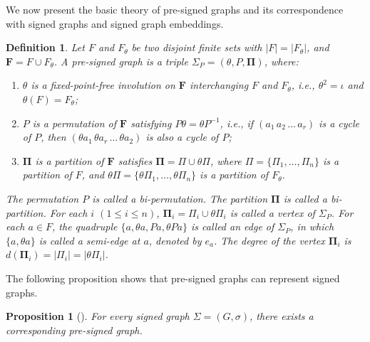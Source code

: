 \documentclass[10pt,a4paper]{amsart}
\newtheorem{proposition}[theorem]{Proposition}
\newtheorem{definition}[theorem]{Definition}
\begin{document}
We now present the basic theory of pre-signed graphs and its correspondence with signed graphs and signed graph embeddings.
\begin{definition}
Let $F$ and $F_{\theta}$ be two disjoint finite sets with $|F|=|F_{\theta}|$, and $\mathbf F=F\cup F_{\theta}$. A \emph{pre-signed graph} is a triple $\Sigma_P=(\theta,P,\mathbf{\Pi})$, where:
\begin{enumerate}[label=(\arabic*)]
\item $\theta$ is a fixed-point-free involution on $\mathbf F$ interchanging $F$ and $F_{\theta}$, i.e., $\theta^2=\iota$ and $\theta(F)=F_{\theta}$;
\item $P$ is a permutation of $\mathbf F$ satisfying $P\theta=\theta P^{-1}$, i.e., if $(a_1\,a_2\,\ldots\,a_r)$ is a cycle of $P$, then $(\theta a_1\,\theta a_r\,\ldots\,\theta a_2)$ is also a cycle of $P$;
\item $\mathbf{\Pi}$ is a partition of $\mathbf F$ satisfies
$\mathbf{\Pi}=\Pi\cup\theta\Pi$, where $\Pi=\{\Pi_1,\ldots,\Pi_n\}$ is a partition of $F$, and $\theta\Pi=\{\theta\Pi_1,\ldots,\theta\Pi_n\}$ is a partition of $F_{\theta}$.
\end{enumerate}
The permutation $P$ is called a \emph{bi-permutation}.
The partition $\mathbf{\Pi}$ is called a \emph{bi-partition}.
For each $i$ $(1\leq i\leq n)$, $\mathbf{\Pi}_i=\Pi_i\cup\theta\Pi_i$ is called a {\it vertex} of $\Sigma_P$. For each $a\in F$, the quadruple $\{a, \theta a, Pa, \theta Pa \}$ is called an {\it edge} of $\Sigma_P$, in which $\{a, \theta a\}$ is called a {\it semi-edge} at $a$, denoted by $e_a$.
The degree of the vertex $\mathbf{\Pi}_i$ is $d(\mathbf{\Pi}_i)=|\Pi_i|=|\theta\Pi_i|$.
\end{definition}

The following proposition shows that pre-signed graphs can represent signed graphs.

\begin{proposition}[\cite{Chen2026PreSigned}]\label{p2:2}
For every signed graph $\Sigma=(G,\sigma)$, there exists a corresponding pre-signed graph.
\end{proposition}
\end{document}
